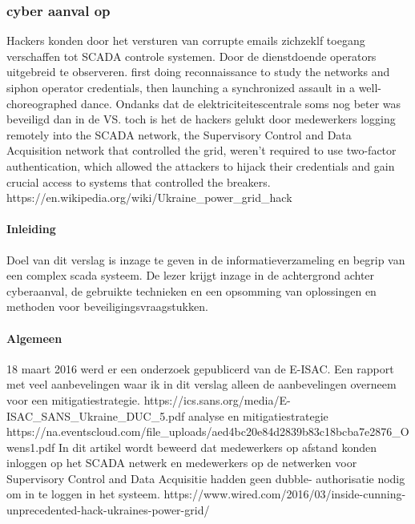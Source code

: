 
\subsubsection{ cyber aanval op  }


Hackers konden door het versturen van corrupte emails zichzeklf toegang verschaffen tot  SCADA controle systemen. Door de dienstdoende operators uitgebreid te observeren.
first doing reconnaissance to study the networks and siphon operator credentials, then launching a synchronized assault in a well-choreographed dance.
Ondanks dat de elektriciteitescentrale soms nog beter was beveiligd dan in de VS. toch is het de hackers gelukt door medewerkers logging remotely into the SCADA network, the Supervisory Control and Data Acquisition network that controlled the grid, weren't required to use two-factor authentication, which allowed the attackers to hijack their credentials and gain crucial access to systems that controlled the breakers.
https://en.wikipedia.org/wiki/Ukraine_power_grid_hack 



 \paragraph{Inleiding}



Doel van dit verslag is inzage te geven in de informatieverzameling en begrip van een complex scada
systeem. De lezer krijgt inzage in de achtergrond achter cyberaanval, de gebruikte technieken en
een opsomming van oplossingen en methoden voor beveiligingsvraagstukken.

\paragraph{Algemeen}


18 maart 2016 werd er een onderzoek gepublicerd van de E-ISAC. Een rapport met veel
aanbevelingen waar ik in dit verslag alleen de aanbevelingen overneem voor een mitigatiestrategie.
https://ics.sans.org/media/E-ISAC_SANS_Ukraine_DUC_5.pdf
analyse en mitigatiestrategie
https://na.eventscloud.com/file_uploads/aed4bc20e84d2839b83c18bcba7e2876_Owens1.pdf
In dit artikel wordt beweerd dat medewerkers op afstand konden inloggen op het SCADA netwerk en
medewerkers op de netwerken voor Supervisory Control and Data Acquisitie hadden geen dubble-
authorisatie nodig om in te loggen in het systeem.
https://www.wired.com/2016/03/inside-cunning-unprecedented-hack-ukraines-power-grid/

